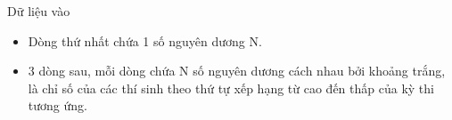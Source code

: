 Dữ liệu vào
\begin{itemize}
	\item     Dòng thứ nhất chứa 1 số nguyên dương N.   
	\item     3 dòng sau, mỗi dòng chứa N số nguyên dương cách nhau bởi khoảng trắng, là chỉ số của các thí sinh theo thứ tự xếp hạng từ cao đến thấp của kỳ   thi tương ứng.   
\end{itemize}